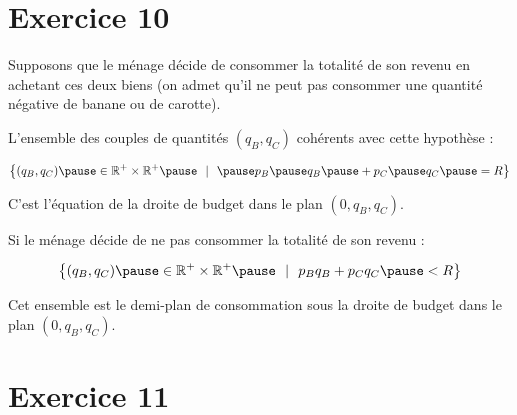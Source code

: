 \documentclass[9pt,professionalfonts,handout,hyperref]{beamer}
\begin{document}
\section{Exercice 10}

%

\begin{frame}

Supposons que le ménage décide de consommer la totalité de son revenu en
achetant ces deux biens (on admet qu'il ne peut pas consommer une
quantité négative de banane ou de carotte). \newline 

\pause L'ensemble des couples de quantités $(q_B, q_C)$ cohérents avec cette hypothèse : 

$$ \left\{(q_B, q_C) \pause \in \mathbb{R}^{+}\times\mathbb{R}^{+} \pause ~~|~~\pause p_B\pause q_B \pause + p_C\pause q_C\pause =R\right\}$$

\pause C'est l'équation de la droite de budget dans le plan $(0,q_B,q_C)$. 

\bigskip 

\pause Si le ménage décide de ne pas consommer la totalité de son revenu :

$$ \left\{(q_B, q_C) \pause \in \mathbb{R}^{+}\times\mathbb{R}^{+} \pause ~~|~~p_Bq_B + p_Cq_C\pause <R\right\}$$


\pause Cet ensemble est le demi-plan de consommation sous la droite de budget dans le plan $(0,q_B,q_C)$. 

\end{frame}


\section{Exercice 11}
\end{document}
